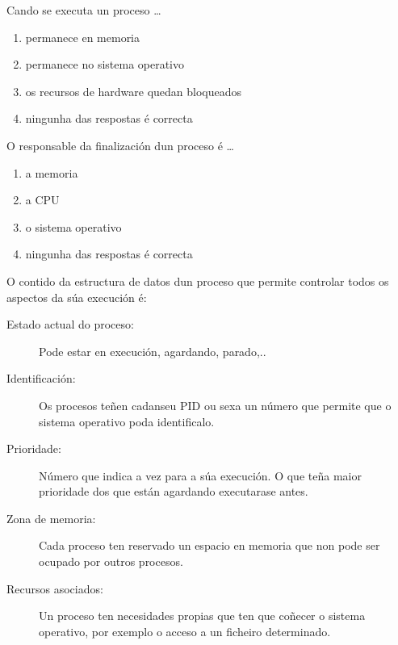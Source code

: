 \begin{diapo}\begin{frame}{Cando se executa un proceso \dots}
\begin{enumerate}
\item  permanece en memoria \pause
\item  permanece no sistema operativo \pause
\item os recursos de hardware quedan bloqueados
\item ningunha das respostas é correcta
\end{enumerate} 
\end{frame} 
\end{diapo} 
\begin{diapo}\begin{frame}{O responsable da finalización dun proceso é \dots}
\begin{enumerate}
\item  a memoria \pause
\item  a CPU\pause
\item o sistema operativo
\item ningunha das respostas é correcta
\end{enumerate} 
\end{frame} 
\end{diapo} 


\begin{singlespace}
O contido da estructura de datos dun proceso que  permite controlar todos os aspectos da súa execución é:
\begin{description}
	\item[Estado actual do proceso:] Pode estar en execución, agardando, parado,..

	\item[Identificación:] Os procesos teñen cadanseu PID ou sexa un número que permite que o sistema operativo poda identificalo. 
	\item[Prioridade:] Número que indica a vez para a súa execución. O que teña maior prioridade dos que están agardando executarase antes.
	\item[Zona de memoria:] Cada proceso ten reservado un espacio en memoria que non pode ser ocupado por outros procesos.
	\item[Recursos asociados:] Un proceso ten necesidades propias que ten que coñecer o sistema operativo, por exemplo o acceso a un ficheiro  determinado.
\end{description} 
\end{singlespace}

